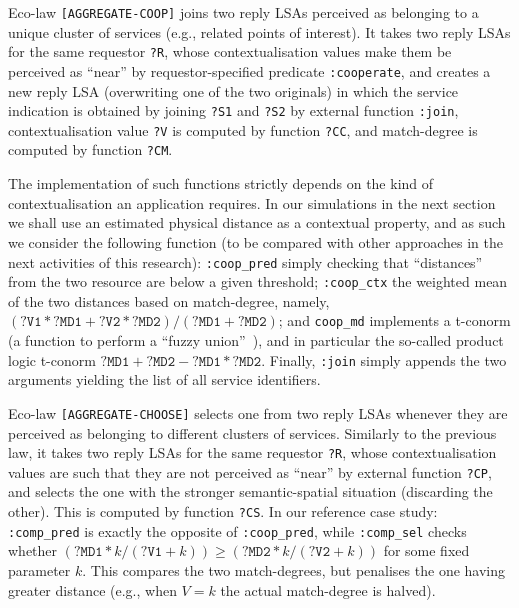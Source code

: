\documentclass[12pt,a4paper,twoside,openright]{book}
\begin{document}
Eco-law \texttt{[AGGREGATE-COOP]} joins two reply LSAs perceived as belonging to a unique cluster of services (e.g., related points of interest).
%
It takes two reply LSAs for the same requestor \texttt{?R}, whose contextualisation values make them be perceived as ``near'' by requestor-specified predicate \texttt{:cooperate}, and creates a new reply LSA (overwriting one of the two originals) in which the service indication is obtained by joining \texttt{?S1} and \texttt{?S2} by external function \texttt{:join}, contextualisation value \texttt{?V} is computed by function \texttt{?CC}, and match-degree is computed by function \texttt{?CM}.

The implementation of such functions strictly depends on the kind of contextualisation an application requires.
%
In our simulations in the next section we shall use an estimated physical distance as a contextual property, and as such we consider the following function (to be compared with other approaches in the next activities of this research): \texttt{:coop\_pred} simply checking that ``distances'' from the two resource are below a given threshold; \texttt{:coop\_ctx} the weighted mean of the two distances based on match-degree, namely, $(\texttt{?V1}*\texttt{?MD1}+\texttt{?V2}*\texttt{?MD2})/(\texttt{?MD1}+\texttt{?MD2})$; and \texttt{coop\_md} implements a t-conorm (a function to perform a ``fuzzy union''~\cite{Bobillo2011758}), and in particular the so-called product logic t-conorm $\texttt{?MD1}+\texttt{?MD2}-\texttt{?MD1}*\texttt{?MD2}$.
%
Finally, \texttt{:join} simply appends the two arguments yielding the list of all service identifiers.

Eco-law \texttt{[AGGREGATE-CHOOSE]} selects one from two reply LSAs whenever they are perceived as belonging to different clusters of services.
%
Similarly to the previous law, it takes two reply LSAs for the same requestor \texttt{?R}, whose contextualisation values are such that they are not perceived as ``near'' by external function \texttt{?CP}, and selects the one with the stronger semantic-spatial situation (discarding the other). This is computed by function \texttt{?CS}.
%
In our reference case study: \texttt{:comp\_pred} is exactly the opposite of \texttt{:coop\_pred}, while \texttt{:comp\_sel} checks whether  $(\texttt{?MD1}*k/(\texttt{?V1}+k))\geq(\texttt{?MD2}*k/(\texttt{?V2}+k))$ for some fixed parameter $k$. This compares the two match-degrees, but penalises the one having greater distance (e.g., when $V=k$ the actual match-degree is halved).
\end{document}
